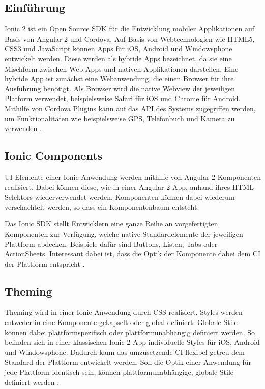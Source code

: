 \subsection{Einführung}

Ionic 2 ist ein Open Source \ac{SDK} für die Entwicklung mobiler Applikationen auf Basis von Angular 2 und Cordova.
Auf Basis von Webtechnologien wie HTML5, CSS3 und JavaScript können Apps für iOS, Android und Windowsphone
entwickelt werden. Diese werden als hybride Apps bezeichnet,
da sie eine Mischform zwischen Web-Apps und nativen Applikationen darstellen.
Eine hybride App ist zunächst eine Webanwendung, die einen Browser für ihre Ausführung benötigt.
Als Browser wird die native Webview der jeweiligen Platform verwendet,
beispielsweise Safari für iOS und Chrome für Android.
Mithilfe von Cordova Plugins kann auf das \ac{API} des Systems zugegriffen werden,
um Funktionalitäten wie beispielsweise GPS, Telefonbuch und Kamera zu verwenden \cite{ionic34:online}.

\subsection{Ionic Components}

\ac{UI}-Elemente einer Ionic Anwendung werden mithilfe von Angular 2 Komponenten realisiert.
Dabei können diese, wie in einer Angular 2 App, anhand ihres HTML Selektors wiederverwendet werden.
Komponenten können dabei wiederum verschachtelt werden, so dass ein Komponentenbaum entsteht.

Das Ionic \ac{SDK} stellt Entwicklern eine ganze Reihe an vorgefertigten Komponenten zur Verfügung,
welche native Standardelemente der jeweiligen Plattform abdecken. Beispiele dafür sind Buttons, Listen, Tabs oder ActionSheets.
Interessant dabei ist, dass die Optik der Komponente dabei dem \ac{CI} der Plattform entspricht \cite{ionic99:online}.

\subsection{Theming}
Theming wird in einer Ionic Anwendung durch \ac{CSS} realisiert.
Styles werden entweder in eine Komponente gekapselt oder global definiert.
Globale Stile können dabei plattformspezifisch oder plattformunabhängig definiert werden.
So befinden sich in einer klassischen Ionic 2 App individuelle Styles für iOS, Android und Windowsphone.
Dadurch kann das umzusetzende \ac{CI} flexibel getreu dem Standard der Plattform entwickelt werden.
Soll die Optik einer Anwendung für jede Plattform identisch sein,
können plattformunabhängige, globale Stile definiert werden \cite{ionic73:online}.


